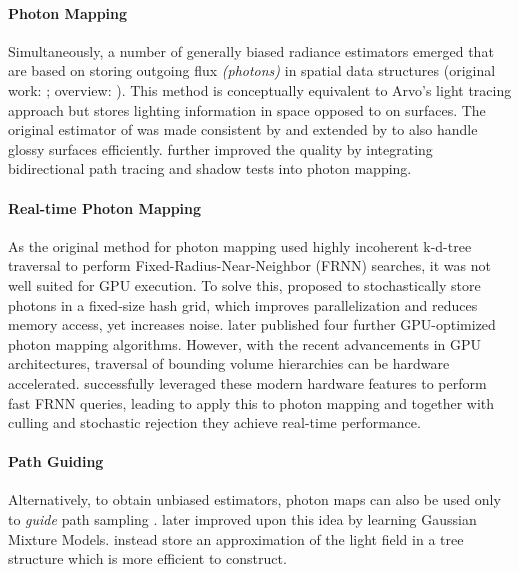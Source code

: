 \paragraph{Photon Mapping}
Simultaneously, a number of generally biased radiance estimators emerged that are based on storing outgoing flux \textit{(photons)} in spatial data structures (original work: \cite{jensen1996}; overview: \cite{kang2016}).
This method is conceptually equivalent to Arvo's light tracing approach  but stores lighting information in space opposed to on surfaces.
The original estimator of \textcite{jensen1996} was made consistent by \textcite{hachisuka2008,knaus2011} and extended by \textcite{hachisuka2009a} to also handle glossy surfaces efficiently.
\textcite{georgiev2012} further improved the quality by integrating bidirectional path tracing and shadow tests into photon mapping.

\paragraph{Real-time Photon Mapping}
As the original method for photon mapping  used highly incoherent k-d-tree traversal to perform Fixed-Radius-Near-Neighbor (FRNN) searches, it was not well suited for GPU execution.
To solve this, \textcite{hachisuka2010} proposed to stochastically store photons in a fixed-size hash grid, which improves parallelization and reduces memory access, yet increases noise.
\textcite{mara2013} later published four further GPU-optimized photon mapping algorithms.
However, with the recent advancements in GPU architectures, traversal of bounding volume hierarchies can be hardware accelerated.
\textcite{evangelou2021} successfully leveraged these modern hardware features to perform fast FRNN queries, leading \textcite{kern2023} to apply this to photon mapping and together with culling and stochastic rejection they achieve real-time performance.

\paragraph{Path Guiding}
Alternatively, to obtain unbiased estimators, photon maps  can also be used only to \textit{guide} path sampling .
\textcite{vorba2014} later improved upon this idea by learning Gaussian Mixture Models.
\textcite{muller2017} instead store an approximation of the light field in a tree structure which is more efficient to construct.

